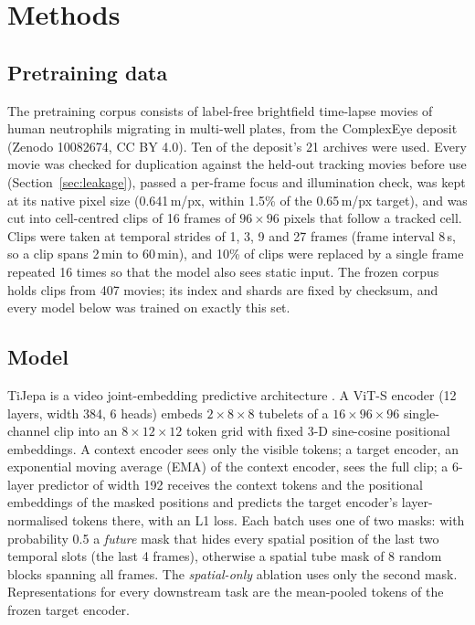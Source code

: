 \section{Methods}
\label{sec:methods}

\subsection{Pretraining data}
\label{sec:corpus}
The pretraining corpus consists of label-free brightfield time-lapse movies of human
neutrophils migrating in multi-well plates, from the ComplexEye deposit
\citep{complexeye} (Zenodo 10082674, CC BY 4.0). Ten of the deposit's 21
archives were used. Every movie was checked for duplication against the held-out
tracking movies before use (Section~\ref{sec:leakage}), passed a per-frame focus and
illumination check, was kept at its native pixel size (0.641\,\textmu m/px, within 1.5\%
of the 0.65\,\textmu m/px target), and was cut into cell-centred clips of 16 frames of
$96\times96$ pixels that follow a tracked cell. Clips were taken at temporal strides of 1,
3, 9 and 27 frames (frame interval 8\,s, so a clip spans 2\,min to 60\,min), and 10\% of
clips were replaced by a single frame repeated 16 times so that the model also sees static
input. The frozen corpus holds  clips from 407 movies; its index and
shards are fixed by checksum, and every model below was trained on exactly this set.

\subsection{Model}
TiJepa is a video joint-embedding predictive architecture
\citep{vjepa}. A ViT-S encoder (12 layers, width 384, 6 heads) embeds
$2\times8\times8$ tubelets of a $16\times96\times96$ single-channel clip into an
$8\times12\times12$ token grid with fixed 3-D sine-cosine positional embeddings. A context
encoder sees only the visible tokens; a target encoder, an exponential moving average
(EMA) of the context encoder, sees the full clip; a 6-layer predictor of width 192
receives the context tokens and the positional embeddings of the masked positions and
predicts the target encoder's layer-normalised tokens there, with an L1 loss. Each batch
uses one of two masks: with probability 0.5 a \emph{future} mask that hides every spatial
position of the last two temporal slots (the last 4 frames), otherwise a spatial tube mask
of 8 random blocks spanning all frames. The \emph{spatial-only} ablation uses only the
second mask. Representations for every downstream task are the mean-pooled tokens of the
frozen target encoder.

